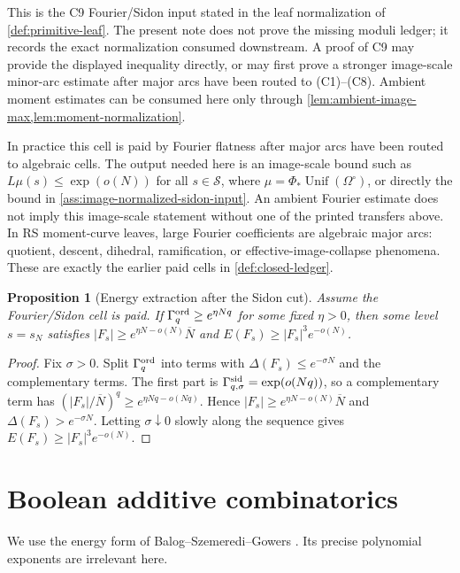 \documentclass[11pt,a4paper]{amsart}
\numberwithin{equation}{section}
\newtheorem{proposition}[theorem]{Proposition}
\theoremstyle{remark}
\newcommand{\Scal}{\mathcal S}
\newcommand{\OmegaC}{\Omega^{\circ}}
\newcommand{\Gord}{\Gamma^{\rm ord}}
\newcommand{\Gsid}{\Gamma^{\rm sid}}
\newcommand{\barN}{\overline N}
\begin{document}
This is the C9 Fourier/Sidon input stated in the leaf normalization of \cref{def:primitive-leaf}.  The present note does not prove the missing moduli ledger; it records the exact normalization consumed downstream.  A proof of C9 may provide the displayed inequality directly, or may first prove a stronger image-scale minor-arc estimate after major arcs have been routed to \textup{(C1)--(C8)}.  Ambient moment estimates can be consumed here only through \cref{lem:ambient-image-max,lem:moment-normalization}.

In practice this cell is paid by Fourier flatness after major arcs have been routed to algebraic cells.  The output needed here is an image-scale bound such as \(L\mu(s)\le\exp(o(N))\) for all \(s\in\Scal\), where \(\mu=\Phi_*\operatorname{Unif}(\OmegaC)\), or directly the bound in \cref{ass:image-normalized-sidon-input}.  An ambient Fourier estimate does not imply this image-scale statement without one of the printed transfers above.  In RS moment-curve leaves, large Fourier coefficients are algebraic major arcs: quotient, descent, dihedral, ramification, or effective-image-collapse phenomena.  These are exactly the earlier paid cells in \cref{def:closed-ledger}.

\begin{proposition}[Energy extraction after the Sidon cut]\label{prop:energy-extract}
Assume the Fourier/Sidon cell is paid.  If \(\Gord_q\ge e^{\eta Nq}\) for some fixed \(\eta>0\), then some level \(s=s_N\) satisfies \(|F_s|\ge e^{\eta N-o(N)}\barN\) and \(E(F_s)\ge |F_s|^3e^{-o(N)}\).
\end{proposition}

\begin{proof}
Fix \(\sigma>0\).  Split \(\Gord_q\) into terms with \(\Delta(F_s)\le e^{-\sigma N}\) and the complementary terms.  The first part is \(\Gsid_{q,\sigma}=\exp(o(Nq))\), so a complementary term has \((|F_s|/\barN)^q\ge e^{\eta Nq-o(Nq)}\).  Hence \(|F_s|\ge e^{\eta N-o(N)}\barN\) and \(\Delta(F_s)>e^{-\sigma N}\).  Letting \(\sigma\downarrow0\) slowly along the sequence gives \(E(F_s)\ge |F_s|^3e^{-o(N)}\).
\end{proof}

\section{Boolean additive combinatorics}\label{sec:bsg}

We use the energy form of Balog--Szemeredi--Gowers \cite{BalogSzemeredi,Gowers1998}.  Its precise polynomial exponents are irrelevant here.
\end{document}
